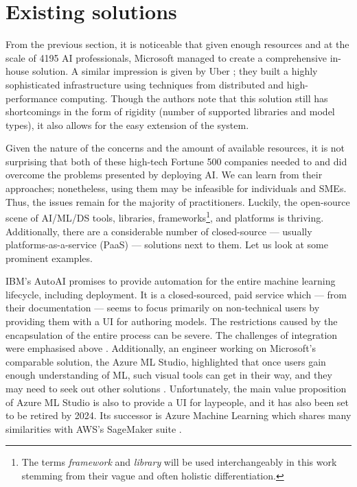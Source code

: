 \section{Existing solutions} \label{section:existing}

From the previous section, it is noticeable that given enough resources and at the scale of 4195 AI professionals, Microsoft managed to create a comprehensive in-house solution. A similar impression is given by Uber \cite{li2017scaling}; they built a highly sophisticated infrastructure using techniques from distributed and high-performance computing. Though the authors note that this solution still has shortcomings in the form of rigidity (number of supported libraries and model types), it also allows for the easy extension of the system.

Given the nature of the concerns and the amount of available resources, it is not surprising that both of these high-tech Fortune 500 companies needed to and did overcome the problems presented by deploying AI. We can learn from their approaches; nonetheless, using them may be infeasible for individuals and SMEs. Thus, the issues remain for the majority of practitioners. Luckily, the open-source scene of AI/ML/DS tools, libraries, frameworks\footnote{The terms \textit{framework} and \textit{library} will be used interchangeably in this work stemming from their vague and often holistic differentiation.}, and platforms is thriving. Additionally, there are a considerable number of closed-source --- usually platforms-as-a-service (PaaS) --- solutions next to them. Let us look at some prominent examples.

IBM's AutoAI \cite{wang2020autoai} promises to provide automation for the entire machine learning lifecycle, including deployment. It is a closed-sourced, paid service which --- from their documentation --- seems to focus primarily on non-technical users by providing them with a UI for authoring models. The restrictions caused by the encapsulation of the entire process can be severe. The challenges of integration were emphasised above \cite{sculley2015hidden}. Additionally, an engineer working on Microsoft's comparable solution, the Azure ML Studio, highlighted that once users gain enough understanding of ML, such visual tools can get in their way, and they may need to seek out other solutions \cite{amershi2019software}. Unfortunately, the main value proposition of Azure ML Studio is also to provide a UI for laypeople, and it has also been set to be retired by 2024. Its successor is Azure Machine Learning which shares many similarities with AWS's SageMaker suite \cite{joshi2020amazon}.

